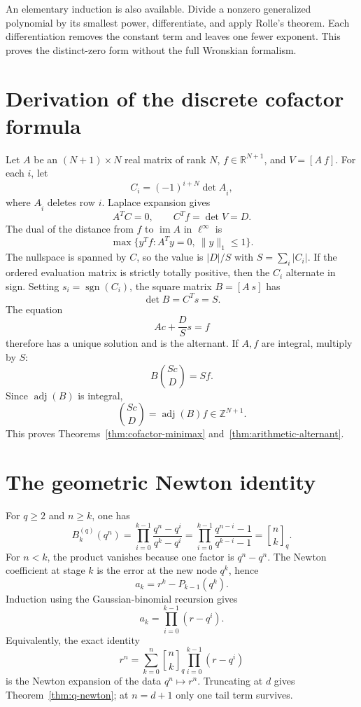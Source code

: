 \documentclass[11pt,oneside]{article}
\theoremstyle{definition}
\theoremstyle{remark}
\newcommand{\Z}{\mathbb Z}
\newcommand{\R}{\mathbb R}
\newcommand{\sgn}{\operatorname{sgn}}
\newcommand{\qbinom}[3]{\genfrac{[}{]}{0pt}{}{#1}{#2}_{#3}}
\begin{document}
An elementary induction is also available.  Divide a nonzero generalized polynomial by its
smallest power, differentiate, and apply Rolle's theorem.  Each differentiation removes the
constant term and leaves one fewer exponent.  This proves the distinct-zero form without the
full Wronskian formalism.


\section{Derivation of the discrete cofactor formula}
\label{app:cofactor}

Let $A$ be an $(N+1)\times N$ real matrix of rank $N$, $f\in\R^{N+1}$, and
$V=[A\ f]$.  For each $i$, let
\[
 C_i=(-1)^{i+N}\det A_{\widehat i},
\]
where $A_{\widehat i}$ deletes row $i$.  Laplace expansion gives
\[
 A^TC=0,
 \qquad
 C^Tf=\det V=D.
\]
The dual of the distance from $f$ to $\operatorname{im}A$ in $\ell^\infty$ is
\[
 \max\{y^Tf:A^Ty=0,\ \|y\|_1\le1\}.
\]
The nullspace is spanned by $C$, so the value is $|D|/S$ with
$S=\sum_i|C_i|$.  If the ordered evaluation matrix is strictly totally positive, then the
$C_i$ alternate in sign.  Setting $s_i=\sgn(C_i)$, the square matrix $B=[A\ s]$ has
\[
 \det B=C^Ts=S.
\]
The equation
\[
 Ac+\frac DSs=f
\]
therefore has a unique solution and is the alternant.  If $A,f$ are integral, multiply by
$S$:
\[
 B\binom{Sc}{D}=Sf.
\]
Since $\operatorname{adj}(B)$ is integral,
\[
 \binom{Sc}{D}=\operatorname{adj}(B)f\in\Z^{N+1}.
\]
This proves Theorems~\ref{thm:cofactor-minimax} and~\ref{thm:arithmetic-alternant}.


\section{The geometric Newton identity}
\label{app:qnewton}

For $q\ge2$ and $n\ge k$, one has
\[
 B_k^{(q)}(q^n)
 =\prod_{i=0}^{k-1}\frac{q^n-q^i}{q^k-q^i}
 =\prod_{i=0}^{k-1}\frac{q^{n-i}-1}{q^{k-i}-1}
 =\qbinom{n}{k}{q}.
\]
For $n<k$, the product vanishes because one factor is $q^n-q^n$.
The Newton coefficient at stage $k$ is the error at the new node $q^k$, hence
\[
 a_k=r^k-P_{k-1}(q^k).
\]
Induction using the Gaussian-binomial recursion gives
\[
 a_k=\prod_{i=0}^{k-1}(r-q^i).
\]
Equivalently, the exact identity
\[
 r^n=\sum_{k=0}^n\qbinom{n}{k}{q}
             \prod_{i=0}^{k-1}(r-q^i)
\]
is the Newton expansion of the data $q^n\mapsto r^n$.  Truncating at $d$ gives
Theorem~\ref{thm:q-newton}; at $n=d+1$ only one tail term survives.
\end{document}
